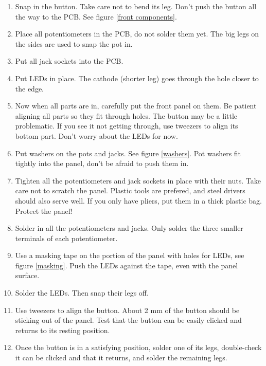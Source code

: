 \documentclass[10pt,a4paper,twocolumn]{article}
\begin{document}
\begin{enumerate}
  \item Snap in the button. Take care not to bend its leg. Don't push the button all the way to the PCB. See figure \ref{front components}.
  \item Place all potentiometers in the PCB, do not solder them yet. The big legs on the sides are used to snap the pot in.
  \item Put all jack sockets into the PCB.
  \item Put LEDs in place. The cathode (shorter leg) goes through the hole closer to the edge.
  \item Now when all parts are in, carefully put the front panel on them. Be patient aligning all parts so they fit through holes. The button may be a little problematic. If you see it not getting through, use tweezers to align its bottom part. Don't worry about the LEDs for now.
  \item Put washers on the pots and jacks. See figure \ref{washers}. Pot washers fit tightly into the panel, don't be afraid to push them in.
  \item Tighten all the potentiometers and jack sockets in place with their nuts. Take care not to scratch the panel. Plastic tools are prefered, and steel drivers should also serve well. If you only have pliers, put them in a thick plastic bag. Protect the panel!
  \item Solder in all the potentiometers and jacks. Only solder the three smaller terminals of each potentiometer.
  \item Use a masking tape on the portion of the panel with holes for LEDs, see figure \ref{masking}. Push the LEDs against the tape, even with the panel surface.
  \item Solder the LEDs. Then snap their legs off.
  \item Use tweezers to align the button. About 2 mm of the button should be sticking out of the panel. Test that the button can be easily clicked and returns to its resting position.
  \item Once the button is in a satisfying position, solder one of its legs, double-check it can be clicked and that it returns, and solder the remaining legs.
\end{enumerate}
\end{document}
